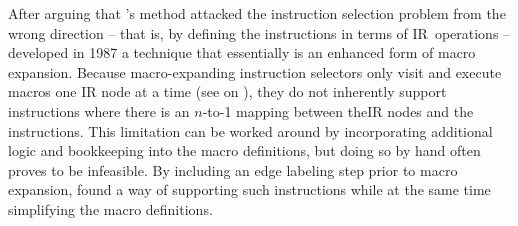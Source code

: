 After arguing that \citeauthor{GlanvilleGraham:1978}'s method attacked the
\gls{instruction selection} problem from the wrong direction -- that is, by
defining the \glspl{instruction} in terms of \gls{IR}~operations --
\textcite{Horspool:1987} developed in 1987 a technique that essentially is an
enhanced form of \gls{macro expansion}.
%
Because \gls{macro}-expanding \glspl{instruction selector} only visit and
execute macros one \gls{IR} \gls{node} at a time (see
 on ), they do not
inherently support \glspl{instruction} where there is an \mbox{$n$-to-1} mapping
between the\gls{IR} \glspl{node} and the \glspl{instruction}.
%
This limitation can be worked around by incorporating additional logic and
bookkeeping into the macro definitions, but doing so by hand often proves to be
infeasible.
%
By including an \gls{edge} labeling step prior to \gls{macro expansion},
\citeauthor{Horspool:1987} found a way of supporting such \glspl{instruction}
while at the same time simplifying the \gls{macro} definitions.


